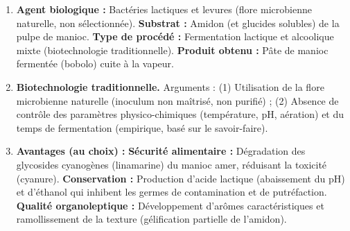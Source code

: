 \documentclass[11pt]{article}
\newcommand{\cle}[1]{{\popxbold\color{popdark}#1}}
\newcounter{popsec}
\newcounter{popsub}
\newcommand{\courssub}[1]{%
  \stepcounter{popsub}%
  \par\vspace{9pt}\noindent{\popxbold\fontsize{11.5}{13}\selectfont\color{popink}{\color{poporange}\thepopsec.\thepopsub}\hspace{6pt}#1}\par\nopagebreak\vspace{4pt}
}
\begin{document}
\courssub{Je m'entraîne}

\begin{corrige}
\begin{enumerate}
\item \textbf{Agent biologique :} Bactéries lactiques et levures (flore microbienne naturelle, non sélectionnée). \textbf{Substrat :} Amidon (et glucides solubles) de la pulpe de manioc. \textbf{Type de procédé :} Fermentation lactique et alcoolique mixte (\cle{biotechnologie traditionnelle}). \textbf{Produit obtenu :} Pâte de manioc fermentée (bobolo) cuite à la vapeur.
\item \textbf{Biotechnologie traditionnelle.} Arguments : (1) Utilisation de la flore microbienne naturelle (inoculum non maîtrisé, non purifié) ; (2) Absence de contrôle des paramètres physico-chimiques (température, pH, aération) et du temps de fermentation (empirique, basé sur le savoir-faire).
\item \textbf{Avantages (au choix) :} \textbf{Sécurité alimentaire :} Dégradation des glycosides cyanogènes (linamarine) du manioc amer, réduisant la toxicité (cyanure). \textbf{Conservation :} Production d'acide lactique (abaissement du pH) et d'éthanol qui inhibent les germes de contamination et de putréfaction. \textbf{Qualité organoleptique :} Développement d'arômes caractéristiques et ramollissement de la texture (gélification partielle de l'amidon).
\end{enumerate}
\end{corrige}
\end{document}
